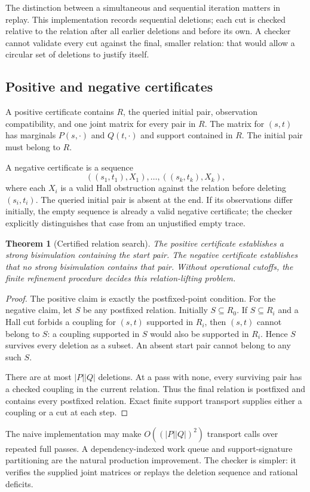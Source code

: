 \documentclass[11pt,letterpaper]{article}
\newtheorem{theorem}{Theorem}[section]
\theoremstyle{definition}\newtheorem{definition}[theorem]{Definition}
\theoremstyle{remark}\newtheorem{remark}[theorem]{Remark}
\begin{document}
The distinction between a simultaneous and sequential iteration matters in replay. This implementation records sequential deletions; each cut is checked relative to the relation after all earlier deletions and before its own. A checker cannot validate every cut against the final, smaller relation: that would allow a circular set of deletions to justify itself.

\subsection{Positive and negative certificates}
A positive certificate contains $R$, the queried initial pair, observation compatibility, and one joint matrix for every pair in $R$. The matrix for $(s,t)$ has marginals $P(s,\cdot)$ and $Q(t,\cdot)$ and support contained in $R$. The initial pair must belong to $R$.

A negative certificate is a sequence
\[
 ((s_1,t_1),X_1),\ldots,((s_k,t_k),X_k),
\]
where each $X_i$ is a valid Hall obstruction against the relation before deleting $(s_i,t_i)$. The queried initial pair is absent at the end. If its observations differ initially, the empty sequence is already a valid negative certificate; the checker explicitly distinguishes that case from an unjustified empty trace.

\begin{theorem}[Certified relation search]\label{thm:bisim}
The positive certificate establishes a strong bisimulation containing the start pair. The negative certificate establishes that no strong bisimulation contains that pair. Without operational cutoffs, the finite refinement procedure decides this relation-lifting problem.
\end{theorem}
\begin{proof}
The positive claim is exactly the postfixed-point condition. For the negative claim, let $S$ be any postfixed relation. Initially $S\subseteq R_0$. If $S\subseteq R_i$ and a Hall cut forbids a coupling for $(s,t)$ supported in $R_i$, then $(s,t)$ cannot belong to $S$: a coupling supported in $S$ would also be supported in $R_i$. Hence $S$ survives every deletion as a subset. An absent start pair cannot belong to any such $S$.

There are at most $|P||Q|$ deletions. At a pass with none, every surviving pair has a checked coupling in the current relation. Thus the final relation is postfixed and contains every postfixed relation. Exact finite support transport supplies either a coupling or a cut at each step.
\end{proof}
The naive implementation may make $O((|P||Q|)^2)$ transport calls over repeated full passes. A dependency-indexed work queue and support-signature partitioning are the natural production improvement. The checker is simpler: it verifies the supplied joint matrices or replays the deletion sequence and rational deficits.
\end{document}
